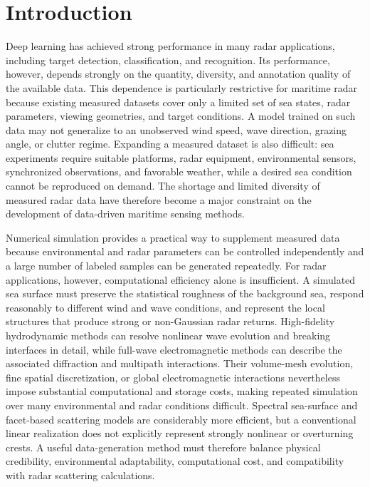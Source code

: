 
\section{Introduction}

Deep learning has achieved strong performance in many radar applications, including target detection, classification, and recognition. Its performance, however, depends strongly on the quantity, diversity, and annotation quality of the available data. This dependence is particularly restrictive for maritime radar because existing measured datasets cover only a limited set of sea states, radar parameters, viewing geometries, and target conditions. A model trained on such data may not generalize to an unobserved wind speed, wave direction, grazing angle, or clutter regime. Expanding a measured dataset is also difficult: sea experiments require suitable platforms, radar equipment, environmental sensors, synchronized observations, and favorable weather, while a desired sea condition cannot be reproduced on demand. The shortage and limited diversity of measured radar data have therefore become a major constraint on the development of data-driven maritime sensing methods.

Numerical simulation provides a practical way to supplement measured data because environmental and radar parameters can be controlled independently and a large number of labeled samples can be generated repeatedly. For radar applications, however, computational efficiency alone is insufficient. A simulated sea surface must preserve the statistical roughness of the background sea, respond reasonably to different wind and wave conditions, and represent the local structures that produce strong or non-Gaussian radar returns. High-fidelity hydrodynamic methods can resolve nonlinear wave evolution and breaking interfaces in detail, while full-wave electromagnetic methods can describe the associated diffraction and multipath interactions. Their volume-mesh evolution, fine spatial discretization, or global electromagnetic interactions nevertheless impose substantial computational and storage costs, making repeated simulation over many environmental and radar conditions difficult. Spectral sea-surface and facet-based scattering models are considerably more efficient, but a conventional linear realization does not explicitly represent strongly nonlinear or overturning crests. A useful data-generation method must therefore balance physical credibility, environmental adaptability, computational cost, and compatibility with radar scattering calculations.

